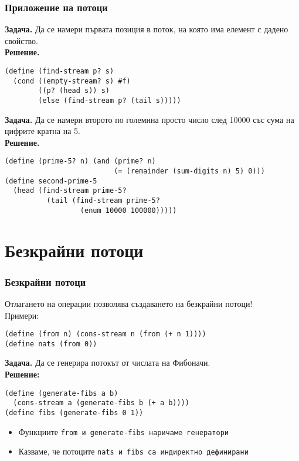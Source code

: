 \documentclass[alsotrans]{beamerswitch}
\begin{document}
\begin{frame}[fragile]
  \frametitle{Приложение на потоци}

  \small
  \textbf{Задача.} Да се намери първата позиция в поток, на която има елемент с дадено свойство.\\
  \pause
  \textbf{Решение.}
\begin{lstlisting}
(define (find-stream p? s)
  (cond ((empty-stream? s) #f)
        ((p? (head s)) s)
        (else (find-stream p? (tail s)))))
\end{lstlisting}
  \pause
  \textbf{Задача.} Да се намери второто по големина просто число след 10000 със сума на цифрите кратна на 5.\\
  \pause
  \textbf{Решение.}
\begin{lstlisting}
(define (prime-5? n) (and (prime? n)
                          (= (remainder (sum-digits n) 5) 0)))
(define second-prime-5
  (head (find-stream prime-5?
          (tail (find-stream prime-5?
                  (enum 10000 100000)))))
\end{lstlisting}
\end{frame}

\section{Безкрайни потоци}

\begin{frame}[fragile]
  \frametitle{Безкрайни потоци}

  Отлагането на операции позволява създаването на \alert{безкрайни потоци}!\\[1em]
  \pause
  Примери:
\begin{lstlisting}
(define (from n) (cons-stream n (from (+ n 1))))
(define nats (from 0))
\end{lstlisting}
  \pause
  \textbf{Задача.} Да се генерира потокът от числата на Фибоначи.\\
  \pause
  \textbf{Решение:}
\begin{lstlisting}
(define (generate-fibs a b)
  (cons-stream a (generate-fibs b (+ a b))))
(define fibs (generate-fibs 0 1))
\end{lstlisting}
  \pause
  \begin{itemize}
  \item Функциите \tt{from} и \tt{generate-fibs} наричаме \alert{генератори}
  \item Казваме, че потоците \tt{nats} и \tt{fibs} са \alert{индиректно дефинирани}
  \end{itemize}
\end{frame}
\end{document}
